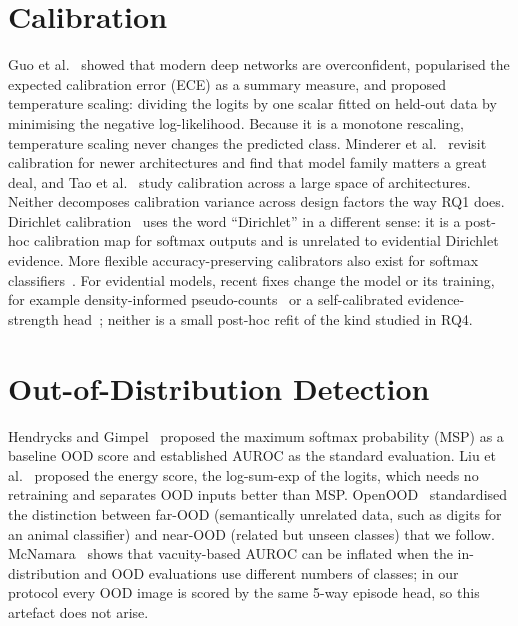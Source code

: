 \section{Calibration}

Guo et al.~\cite{guo2017calibration} showed that modern deep networks are overconfident, popularised
the expected calibration error (ECE) as a summary measure, and proposed temperature scaling: dividing
the logits by one scalar fitted on held-out data by minimising the negative log-likelihood. Because it
is a monotone rescaling, temperature scaling never changes the predicted class. Minderer et
al.~\cite{minderer2021revisiting} revisit calibration for newer architectures and find that model family
matters a great deal, and Tao et al.~\cite{tao2024benchmark} study calibration across a large space of
architectures. Neither decomposes calibration variance across design factors the way RQ1 does. Dirichlet
calibration~\cite{kull2019dirichlet} uses the word ``Dirichlet'' in a different sense: it is a post-hoc
calibration map for softmax outputs and is unrelated to evidential Dirichlet evidence. More flexible
accuracy-preserving calibrators also exist for softmax classifiers~\cite{zhao2026invlt}. For evidential
models, recent fixes change the model or its training, for example density-informed
pseudo-counts~\cite{carlotti2026dipedl} or a self-calibrated evidence-strength head~\cite{turacan2026invascal};
neither is a small post-hoc refit of the kind studied in RQ4.

\section{Out-of-Distribution Detection}

Hendrycks and Gimpel~\cite{hendrycks2017baseline} proposed the maximum softmax probability (MSP) as a
baseline OOD score and established AUROC as the standard evaluation. Liu et al.~\cite{liu2020energy}
proposed the energy score, the log-sum-exp of the logits, which needs no retraining and separates OOD
inputs better than MSP. OpenOOD~\cite{yang2022openood,zhang2024openood15} standardised the distinction
between far-OOD (semantically unrelated data, such as digits for an animal classifier) and near-OOD
(related but unseen classes) that we follow. McNamara~\cite{mcnamara2026vacuity} shows that
vacuity-based AUROC can be inflated when the in-distribution and OOD evaluations use different numbers
of classes; in our protocol every OOD image is scored by the same 5-way episode head, so this artefact
does not arise.

